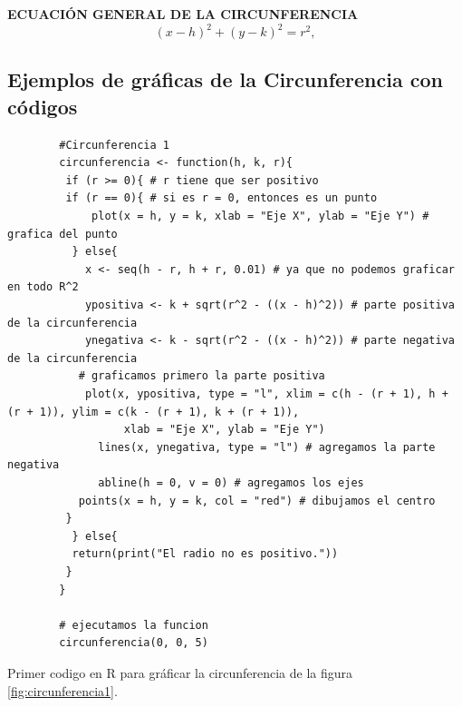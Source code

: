 \documentclass[12pt,a4paper]{article}
\begin{document}
\textbf{ECUACIÓN GENERAL DE LA CIRCUNFERENCIA}
\begin{equation}
(x - h)^2 + (y - k)^2 = r^2, \label{eq:circunferencia}
\end{equation}

\subsection{Ejemplos de gráficas de la Circunferencia con códigos} \label{subsec:ECI}
\begin{table}[htpb]
	\begin{lstlisting}
		#Circunferencia 1
		circunferencia <- function(h, k, r){
 		 if (r >= 0){ # r tiene que ser positivo
   		 if (r == 0){ # si es r = 0, entonces es un punto
 		     plot(x = h, y = k, xlab = "Eje X", ylab = "Eje Y") # grafica del punto
  		  } else{
  		    x <- seq(h - r, h + r, 0.01) # ya que no podemos graficar en todo R^2
  		    ypositiva <- k + sqrt(r^2 - ((x - h)^2)) # parte positiva de la circunferencia
  		    ynegativa <- k - sqrt(r^2 - ((x - h)^2)) # parte negativa de la circunferencia
   		   # graficamos primero la parte positiva
  		    plot(x, ypositiva, type = "l", xlim = c(h - (r + 1), h + (r + 1)), ylim = c(k - (r + 1), k + (r + 1)),
     		      xlab = "Eje X", ylab = "Eje Y")
    		  lines(x, ynegativa, type = "l") # agregamos la parte negativa
    		  abline(h = 0, v = 0) # agregamos los ejes
   		   points(x = h, y = k, col = "red") # dibujamos el centro
   		 }
		  } else{
  		  return(print("El radio no es positivo."))
 		 }
		}
		
		# ejecutamos la funcion
		circunferencia(0, 0, 5)
	\end{lstlisting}
	\caption{Primer codigo en R para gráficar la circunferencia de la figura \ref{fig:circunferencia1}.}
	\label{alg:cir1}
\end{table}
\end{document}
